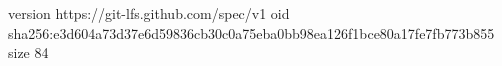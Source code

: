 version https://git-lfs.github.com/spec/v1
oid sha256:e3d604a73d37e6d59836cb30c0a75eba0bb98ea126f1bce80a17fe7fb773b855
size 84
